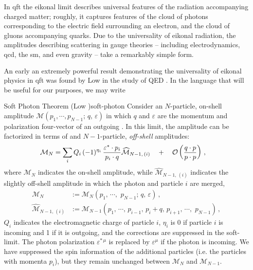 In \gls{qft} the eikonal limit describes universal features of the radiation accompanying charged matter;
%
roughly, it captures features of the cloud of photons corresponding to the electric field surrounding an electron, and the cloud of gluons accompanying quarks.
%
Due to the universality of eikonal radiation, the amplitudes describing scattering in gauge theories -- including electrodynamics, \gls{qcd}, the \gls{sm}, and even gravity -- take a remarkably simple form.

An early an extremely powerful result demonstrating the universality of eikonal physics in \gls{qft} was found by Low in the study of QED \cite{Low:1958sn}.
%
In the language that will be useful for our purposes, we may write

\begin{theorembox}{Soft Photon Theorem (Low \cite{Low:1958sn})}{soft-photon}
    Consider an \(N\)-particle, on-shell amplitude \(\mathcal{M}(p_1, \cdots, p_{N-1};\,q,\,\varepsilon)\) in which \(q\) and \(\varepsilon\) are the momentum and polarization four-vector of an outgoing .
    In this limit, the amplitude can be factorized in terms of  and \(N-1\)-particle, \textit{off-shell} amplitudes:
    \begin{equation}
    \begin{aligned}
        \mathcal{M}_N
        &=
        \sum_{i}
        Q_i
        \,
        (-1)^{\eta_i}
        \,
        \frac{\varepsilon^* \cdot p_i}{p_i \cdot q}
        \widehat{\mathcal{M}}_{N-1,\,(i)}
        \quad
        +
        \quad
        \mathcal{O}\left(\frac{q\cdot p}{p \cdot p}\right)
        \,,
    \end{aligned}
    \end{equation}
    where \(\mathcal{M}_N\) indicates the on-shell amplitude, while \(\widehat{\mathcal{M}}_{N-1,\,(i)}\) indicates the slightly off-shell amplitude in which the  photon and particle \(i\) are merged,
    \begin{align}
        \mathcal{M}_N
        &:=
        \mathcal{M}_N(p_1,\,\cdots,\,\,p_{N-1};\,q,\,\varepsilon)
        \,,
        \\
        \widehat{\mathcal{M}}_{N-1,\,(i)}
        &:=
        \mathcal{M}_{N-1}(
            p_1,\,\cdots,\,
            p_{i-1},\,
            p_i + q,\,
            p_{i+1},\,
            \cdots,\,\,p_{N-1}
        )
        \,,
    \end{align}
    \(Q_i\) indicates the electromagnetic charge of particle \(i\), \(\eta_i\) is 0 if particle \(i\) is incoming and 1 if it is outgoing, and the corrections are suppressed in the \gls{soft-limit}.
    The photon polarization \(\varepsilon^{*\,\mu}\) is replaced by \(\varepsilon^{\mu}\) if the photon is incoming.
    We have suppressed the spin information of the additional particles (i.e. the particles with momenta \(p_i\)), but they remain unchanged between \(\mathcal{M}_N\) and \(\mathcal{M}_{N-1}\).
\end{theorembox}

